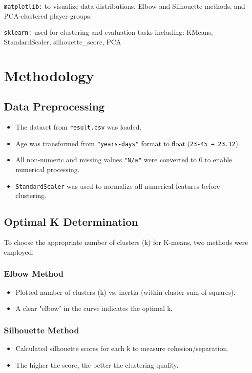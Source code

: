 \documentclass[12pt,a4paper]{report}
\begin{document}
   \texttt{matplotlib:} to visualize data distributions, Elbow and Silhouette methods, and PCA-clustered player groups.
   
   \texttt{sklearn:}  used for clustering and evaluation tasks including: KMeans, StandardScaler, silhouette\_score, PCA

\section{Methodology}
\subsection{Data Preprocessing}
\begin{itemize}
    \item The dataset from \texttt{result.csv} was loaded.
    \item Age was transformed from \texttt{"years-days"} format to float (\texttt{23-45 → 23.12}).
    \item All non-numeric and missing values \texttt{"N/a"} were converted to 0 to enable numerical processing.
    \item \texttt{StandardScaler} was used to normalize all numerical features before clustering.
\end{itemize}

\subsection{Optimal K Determination}
To choose the appropriate number of clusters (k) for K-means, two methods were employed:

\subsubsection{Elbow Method}
\begin{itemize}
    \item Plotted number of clusters (k) vs. inertia (within-cluster sum of squares).
    \item A clear "elbow" in the curve indicates the optimal k.
\end{itemize}

\subsubsection{Silhouette Method}
\begin{itemize}
    \item Calculated silhouette scores for each k to measure cohesion/separation.
    \item The higher the score, the better the clustering quality.
\end{itemize}
\end{document}
